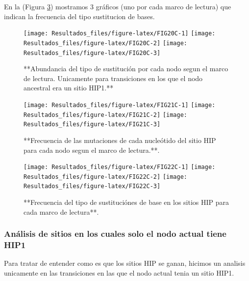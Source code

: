 \documentclass[
]{book}
\begin{document}
En la (Figura \ref{fig:FIG22C}) mostramos 3 gráficos (uno por cada marco de lectura) que indican la frecuencia del tipo sustitucion de bases.

\begin{figure}

{\centering \texttt{[image: Resultados\_files/figure-latex/FIG20C-1]} \texttt{[image: Resultados\_files/figure-latex/FIG20C-2]} \texttt{[image: Resultados\_files/figure-latex/FIG20C-3]} 

}

\caption{**Abundancia del tipo de sustitución por cada nodo segun el marco de lectura. Unicamente para transiciones en los que el nodo ancestral era un sitio HIP1.**}\label{fig:FIG20C}
\end{figure}

\begin{figure}

{\centering \texttt{[image: Resultados\_files/figure-latex/FIG21C-1]} \texttt{[image: Resultados\_files/figure-latex/FIG21C-2]} \texttt{[image: Resultados\_files/figure-latex/FIG21C-3]} 

}

\caption{**Frecuencia de las mutaciones de cada nucleótido del sitio HIP para cada nodo segun el marco de lectura.**.}\label{fig:FIG21C}
\end{figure}

\begin{figure}

{\centering \texttt{[image: Resultados\_files/figure-latex/FIG22C-1]} \texttt{[image: Resultados\_files/figure-latex/FIG22C-2]} \texttt{[image: Resultados\_files/figure-latex/FIG22C-3]} 

}

\caption{**Frecuencia del tipo de sustituciónes de base en los sitios HIP para cada marco de lectura**.}\label{fig:FIG22C}
\end{figure}

\hypertarget{anuxe1lisis-de-sitios-en-los-cuales-solo-el-nodo-actual-tiene-hip1-1}{%
\subsubsection{Análisis de sitios en los cuales solo el nodo actual tiene HIP1}\label{anuxe1lisis-de-sitios-en-los-cuales-solo-el-nodo-actual-tiene-hip1-1}}

Para tratar de entender como es que los sitios HIP se ganan, hicimos un analisis unicamente en las transiciones en las que el nodo actual tenia un sitio HIP1.
\end{document}
